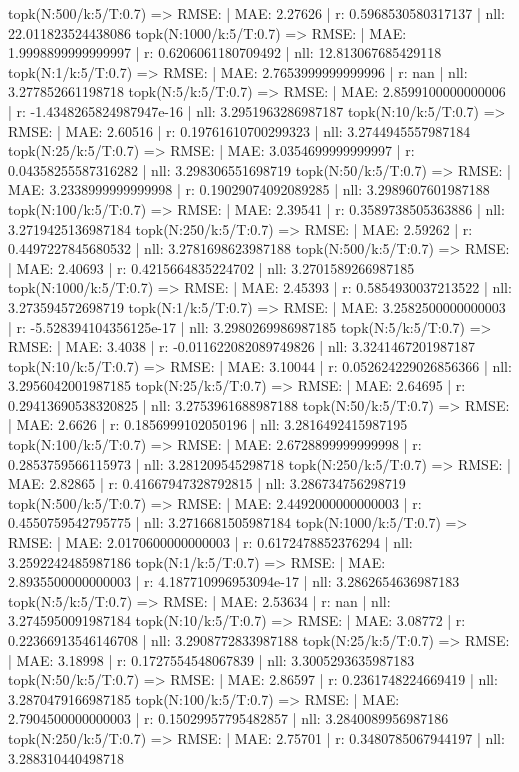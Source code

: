 topk(N:500/k:5/T:0.7) => RMSE: | MAE: 2.27626 | r: 0.5968530580317137 | nll: 22.011823524438086
topk(N:1000/k:5/T:0.7) => RMSE: | MAE: 1.9998899999999997 | r: 0.6206061180709492 | nll: 12.813067685429118
topk(N:1/k:5/T:0.7) => RMSE: | MAE: 2.7653999999999996 | r: nan | nll: 3.277852661198718
topk(N:5/k:5/T:0.7) => RMSE: | MAE: 2.8599100000000006 | r: -1.4348265824987947e-16 | nll: 3.2951963286987187
topk(N:10/k:5/T:0.7) => RMSE: | MAE: 2.60516 | r: 0.19761610700299323 | nll: 3.2744945557987184
topk(N:25/k:5/T:0.7) => RMSE: | MAE: 3.0354699999999997 | r: 0.04358255587316282 | nll: 3.298306551698719
topk(N:50/k:5/T:0.7) => RMSE: | MAE: 3.2338999999999998 | r: 0.19029074092089285 | nll: 3.2989607601987188
topk(N:100/k:5/T:0.7) => RMSE: | MAE: 2.39541 | r: 0.3589738505363886 | nll: 3.2719425136987184
topk(N:250/k:5/T:0.7) => RMSE: | MAE: 2.59262 | r: 0.4497227845680532 | nll: 3.2781698623987188
topk(N:500/k:5/T:0.7) => RMSE: | MAE: 2.40693 | r: 0.4215664835224702 | nll: 3.2701589266987185
topk(N:1000/k:5/T:0.7) => RMSE: | MAE: 2.45393 | r: 0.5854930037213522 | nll: 3.273594572698719
topk(N:1/k:5/T:0.7) => RMSE: | MAE: 3.2582500000000003 | r: -5.528394104356125e-17 | nll: 3.2980269986987185
topk(N:5/k:5/T:0.7) => RMSE: | MAE: 3.4038 | r: -0.011622082089749826 | nll: 3.3241467201987187
topk(N:10/k:5/T:0.7) => RMSE: | MAE: 3.10044 | r: 0.052624229026856366 | nll: 3.2956042001987185
topk(N:25/k:5/T:0.7) => RMSE: | MAE: 2.64695 | r: 0.29413690538320825 | nll: 3.2753961688987188
topk(N:50/k:5/T:0.7) => RMSE: | MAE: 2.6626 | r: 0.1856999102050196 | nll: 3.2816492415987195
topk(N:100/k:5/T:0.7) => RMSE: | MAE: 2.6728899999999998 | r: 0.2853759566115973 | nll: 3.281209545298718
topk(N:250/k:5/T:0.7) => RMSE: | MAE: 2.82865 | r: 0.41667947328792815 | nll: 3.286734756298719
topk(N:500/k:5/T:0.7) => RMSE: | MAE: 2.4492000000000003 | r: 0.4550759542795775 | nll: 3.2716681505987184
topk(N:1000/k:5/T:0.7) => RMSE: | MAE: 2.0170600000000003 | r: 0.6172478852376294 | nll: 3.2592242485987186
topk(N:1/k:5/T:0.7) => RMSE: | MAE: 2.8935500000000003 | r: 4.187710996953094e-17 | nll: 3.2862654636987183
topk(N:5/k:5/T:0.7) => RMSE: | MAE: 2.53634 | r: nan | nll: 3.2745950091987184
topk(N:10/k:5/T:0.7) => RMSE: | MAE: 3.08772 | r: 0.22366913546146708 | nll: 3.2908772833987188
topk(N:25/k:5/T:0.7) => RMSE: | MAE: 3.18998 | r: 0.1727554548067839 | nll: 3.3005293635987183
topk(N:50/k:5/T:0.7) => RMSE: | MAE: 2.86597 | r: 0.2361748224669419 | nll: 3.2870479166987185
topk(N:100/k:5/T:0.7) => RMSE: | MAE: 2.7904500000000003 | r: 0.15029957795482857 | nll: 3.2840089956987186
topk(N:250/k:5/T:0.7) => RMSE: | MAE: 2.75701 | r: 0.3480785067944197 | nll: 3.288310440498718
